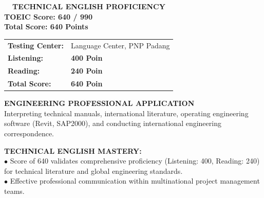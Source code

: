 \documentclass[10pt,a4paper,landscape]{article}
\begin{document}
\noindent
\begin{minipage}[t]{0.30\linewidth}
  \vspace{0pt}
  \begin{tcolorbox}[sharp corners, boxrule=0.8pt, colframe=pborder, colback=white, left=3mm, right=3mm, top=2.5mm, bottom=2.5mm, height=100mm]
    \colorbox{pred}{\fontsize{7pt}{8pt}\selectfont\bfseries\color{white}\ \ TECHNICAL ENGLISH PROFICIENCY\ \ }\\[1.5mm]
    {\fontsize{9.5pt}{11.5pt}\selectfont\bfseries\color{pnavy}TOEIC Score: 640 / 990}\\[0.5mm]
    {\fontsize{7pt}{8.5pt}\selectfont\bfseries\color{pred}Total Score: 640 Points}\\[2mm]

    \begin{tcolorbox}[sharp corners, boxrule=0.5pt, colframe=pborder, colback=pbglight, left=2mm, right=2mm, top=1.5mm, bottom=1.5mm]
      \begin{tabularx}{\linewidth}{@{}p{22mm} X@{}}
        {\fontsize{6.8pt}{8pt}\selectfont\bfseries Testing Center:} & {\fontsize{6.8pt}{8pt}\selectfont Language Center, PNP Padang} \\[0.8mm]
        {\fontsize{6.8pt}{8pt}\selectfont\bfseries Listening:} & {\fontsize{6.8pt}{8pt}\selectfont\bfseries 400 Poin} \\[0.8mm]
        {\fontsize{6.8pt}{8pt}\selectfont\bfseries Reading:} & {\fontsize{6.8pt}{8pt}\selectfont\bfseries 240 Poin} \\[0.8mm]
        {\fontsize{6.8pt}{8pt}\selectfont\bfseries Total Score:} & {\fontsize{6.8pt}{8pt}\selectfont\bfseries\color{pred} 640 Poin}
      \end{tabularx}
    \end{tcolorbox}
    \vspace{1.5mm}

    {\fontsize{7.5pt}{9pt}\selectfont\bfseries\color{pnavy}ENGINEERING PROFESSIONAL APPLICATION}\\[0.8mm]
    {\fontsize{6.5pt}{8.2pt}\selectfont\color{psteel}
    Interpreting technical manuals, international literature, operating engineering software (Revit, SAP2000), and conducting international engineering correspondence.
    }
  \end{tcolorbox}
  \vspace{2mm}

  \begin{tcolorbox}[sharp corners, boxrule=0.6pt, colframe=pnavy, colback=pbglight, left=2.5mm, right=2.5mm, top=2mm, bottom=2mm, height=52mm]
    {\fontsize{7pt}{8.5pt}\selectfont\bfseries\color{pnavy}TECHNICAL ENGLISH MASTERY:}\\[1.5mm]
    {\fontsize{6.5pt}{8.2pt}\selectfont\color{psteel}
    $\bullet$ Score of 640 validates comprehensive proficiency (Listening: 400, Reading: 240) for technical literature and global engineering standards.\\
    $\bullet$ Effective professional communication within multinational project management teams.
    }
  \end{tcolorbox}
\end{minipage}%
\end{document}
